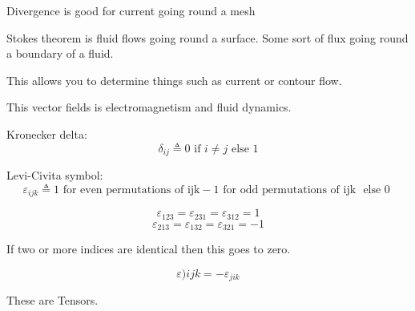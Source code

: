\documentclass[10pt,a4paper]{article}
\begin{document}
Divergence is good for current going round a mesh

Stokes theorem is fluid flows going round a surface. Some sort of flux going round a
boundary of a fluid.

This allows you to determine things such as current or contour flow.

This vector fields is electromagnetism and fluid dynamics.

Kronecker delta:
\[
\delta_{ij} \triangleq 0 \text{ if } i \neq j \text{ else } 1
\]

Levi-Civita symbol:
\[
\varepsilon_{ijk} \triangleq 1 \text{ for even permutations of ijk} -1 \text{ for odd permutations of ijk } \text{ else 0 }
\]

\[
\varepsilon_{123} = \varepsilon_{231} = \varepsilon_{312} = 1
\]
\[
\varepsilon_{213} = \varepsilon_{132} = \varepsilon_{321} = -1
\]

If two or more indices are identical then this goes to zero.

\[
\varepsilon){ijk} = -\varepsilon_{jik}
\]

These are Tensors.
\end{document}
